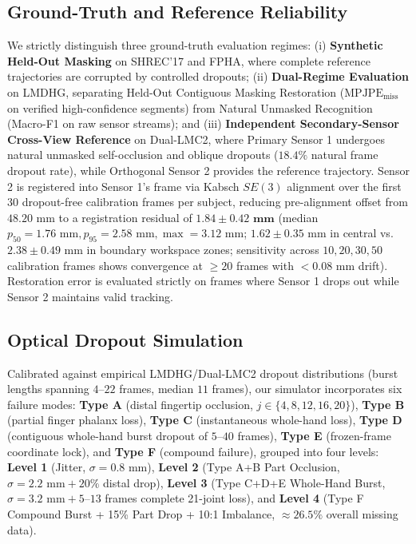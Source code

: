 \documentclass[10pt,twocolumn]{article}
\begin{document}
\subsection{Ground-Truth and Reference Reliability}
We strictly distinguish three ground-truth evaluation regimes: (i) \textbf{Synthetic Held-Out Masking} on SHREC'17 and FPHA, where complete reference trajectories are corrupted by controlled dropouts; (ii) \textbf{Dual-Regime Evaluation} on LMDHG, separating Held-Out Contiguous Masking Restoration ($\text{MPJPE}_{\text{miss}}$ on verified high-confidence segments) from Natural Unmasked Recognition (Macro-F1 on raw sensor streams); and (iii) \textbf{Independent Secondary-Sensor Cross-View Reference} on Dual-LMC2, where Primary Sensor 1 undergoes natural unmasked self-occlusion and oblique dropouts ($18.4\%$ natural frame dropout rate), while Orthogonal Sensor 2 provides the reference trajectory. Sensor 2 is registered into Sensor 1's frame via Kabsch $SE(3)$ alignment over the first $30$ dropout-free calibration frames per subject, reducing pre-alignment offset from $48.20\text{ mm}$ to a registration residual of $\mathbf{1.84 \pm 0.42\text{ mm}}$ (median $p_{50}=1.76\text{ mm}, p_{95}=2.58\text{ mm}, \max=3.12\text{ mm}$; $1.62 \pm 0.35\text{ mm}$ in central vs.\ $2.38 \pm 0.49\text{ mm}$ in boundary workspace zones; sensitivity across $10, 20, 30, 50$ calibration frames shows convergence at $\ge 20$ frames with $<0.08\text{ mm}$ drift). Restoration error is evaluated strictly on frames where Sensor 1 drops out while Sensor 2 maintains valid tracking.

\subsection{Optical Dropout Simulation}
Calibrated against empirical LMDHG/Dual-LMC2 dropout distributions (burst lengths spanning $4\text{--}22$ frames, median $11$ frames), our simulator incorporates six failure modes: \textbf{Type A} (distal fingertip occlusion, $j \in \{4,8,12,16,20\}$), \textbf{Type B} (partial finger phalanx loss), \textbf{Type C} (instantaneous whole-hand loss), \textbf{Type D} (contiguous whole-hand burst dropout of $5\text{--}40$ frames), \textbf{Type E} (frozen-frame coordinate lock), and \textbf{Type F} (compound failure), grouped into four levels: \textbf{Level 1} (Jitter, $\sigma=0.8\text{ mm}$), \textbf{Level 2} (Type A+B Part Occlusion, $\sigma=2.2\text{ mm} + 20\%$ distal drop), \textbf{Level 3} (Type C+D+E Whole-Hand Burst, $\sigma=3.2\text{ mm} + 5\text{--}13$ frames complete 21-joint loss), and \textbf{Level 4} (Type F Compound Burst + 15\% Part Drop + 10:1 Imbalance, $\approx 26.5\%$ overall missing data).
\end{document}
